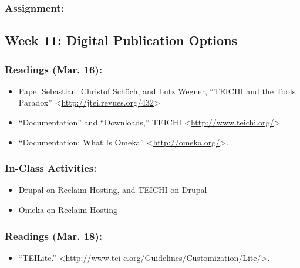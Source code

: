 \documentclass[]{article}
\begin{document}
\subsubsection{Assignment:}\label{assignment-4}

\subsection{Week 11: Digital Publication
Options}\label{week-11-digital-publication-options}

\subsubsection{Readings (Mar. 16):}\label{readings-mar.-16}

\begin{itemize}
\itemsep1pt\parskip0pt
\item
  Pape, Sebastian, Christof Schöch, and Lutz Wegner, ``TEICHI and the
  Tools Paradox''
  \textless{}\url{http://jtei.revues.org/432}\textgreater{}
\item
  ``Documentation'' and ``Downloads,'' TEICHI
  \textless{}\url{http://www.teichi.org/}\textgreater{}
\item
  ``Documentation: What Is Omeka''
  \textless{}\url{http://omeka.org/}\textgreater{}.
\end{itemize}

\subsubsection{In-Class Activities:}\label{in-class-activities-2}

\begin{itemize}
\itemsep1pt\parskip0pt
\item
  Drupal on Reclaim Hosting, and TEICHI on Drupal
\item
  Omeka on Reclaim Hosting
\end{itemize}

\subsubsection{Readings (Mar. 18):}\label{readings-mar.-18}

\begin{itemize}
\itemsep1pt\parskip0pt
\item
  ``TEILite.''
  \textless{}\url{http://www.tei-c.org/Guidelines/Customization/Lite/}\textgreater{}.
\end{itemize}
\end{document}
